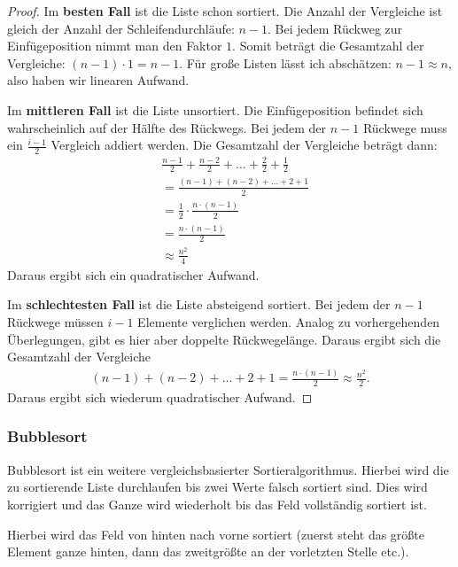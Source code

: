 \begin{proof}
	Im \textbf{besten Fall} ist die Liste schon sortiert. Die Anzahl der Vergleiche ist gleich der Anzahl der Schleifendurchläufe: $n-1$. Bei jedem Rückweg zur Einfügeposition nimmt man den Faktor $1$. Somit beträgt die Gesamtzahl der Vergleiche: $(n-1) \cdot 1 = n - 1$. Für große Listen lässt ich abschätzen: $n - 1 \approx n$, also haben wir linearen Aufwand.

	Im \textbf{mittleren Fall} ist die Liste unsortiert. Die Einfügeposition befindet sich wahrscheinlich auf der Hälfte des Rückwegs. Bei jedem der $n-1$ Rückwege muss ein $\frac{i-1}{2}$ Vergleich addiert werden. Die Gesamtzahl der Vergleiche beträgt dann:
	\begin{align*}
		 & \frac{n-1}{2} + \frac{n-2}{2} + \dots + \frac{2}{2} + \frac{1}{2} \\
		 & = \frac{(n-1) + (n-2) + \dots + 2 + 1}{2}                         \\
		 & = \frac{1}{2} \cdot \frac{n \cdot (n-1)}{2}                       \\
		 & = \frac{n \cdot (n - 1)}{2}                                       \\
		 & \approx \frac{n^2}{4}
	\end{align*}
	Daraus ergibt sich ein quadratischer Aufwand.

	Im \textbf{schlechtesten Fall} ist die Liste absteigend sortiert. Bei jedem der $n-1$ Rückwege müssen $i-1$ Elemente verglichen werden. Analog zu vorhergehenden Überlegungen, gibt es hier aber doppelte Rückwegelänge. Daraus ergibt sich die Gesamtzahl der Vergleiche
	\begin{align*}
		(n-1) + (n-2) + \dots + 2 + 1 = \frac{n \cdot (n-1)}{2} \approx \frac{n^2}{2}.
	\end{align*}
	Daraus ergibt sich wiederum quadratischer Aufwand.
\end{proof}

\subsubsection{Bubblesort}
Bubblesort ist ein weitere vergleichsbasierter Sortieralgorithmus. Hierbei wird die zu sortierende Liste durchlaufen bis zwei Werte falsch sortiert sind. Dies wird korrigiert und das Ganze wird wiederholt bis das Feld vollständig sortiert ist.

Hierbei wird das Feld von hinten nach vorne sortiert (zuerst steht das größte Element ganze hinten, dann das zweitgrößte an der vorletzten Stelle etc.).

